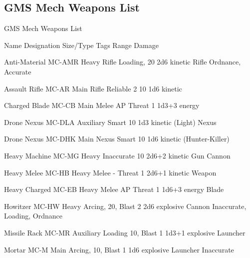 \subsection{GMS Mech Weapons List}
                                   GMS Mech Weapons List  

Name                 Designation        Size/Type        Tags                Range          Damage 

Anti-Material        MC-AMR             Heavy Rifle       Loading,            20            2d6 kinetic 
Rifle                                                     Ordnance,  
                                                        Accurate 

Assault Rifle         MC-AR              Main Rifle        Reliable 2          10             1d6 kinetic 

Charged Blade        MC-CB              Main Melee      AP                  Threat 1        1d3+3 energy 

Drone Nexus          MC-DLA             Auxiliary        Smart               10             1d3 kinetic 
(Light)                                 Nexus 

Drone Nexus          MC-DHK             Main Nexus       Smart               10             1d6 kinetic 
(Hunter-Killer) 

Heavy Machine        MC-MG              Heavy            Inaccurate          10            2d6+2 kinetic 
Gun                                     Cannon 

Heavy Melee          MC-HB              Heavy Melee      -                  Threat 1       2d6+1 kinetic 
Weapon 

Heavy Charged        MC-EB              Heavy Melee     AP                  Threat 1        1d6+3 energy 
Blade 

Howitzer             MC-HW              Heavy           Arcing,              20, Blast 2   2d6 explosive 
                                        Cannon           Inaccurate,  
                                                         Loading,  
                                                         Ordnance 

Missile Rack         MC-MR              Auxiliary        Loading             10, Blast 1    1d3+1 explosive 
                                        Launcher 

Mortar               MC-M               Main            Arcing,              10, Blast 1    1d6 explosive 
                                        Launcher         Inaccurate 

